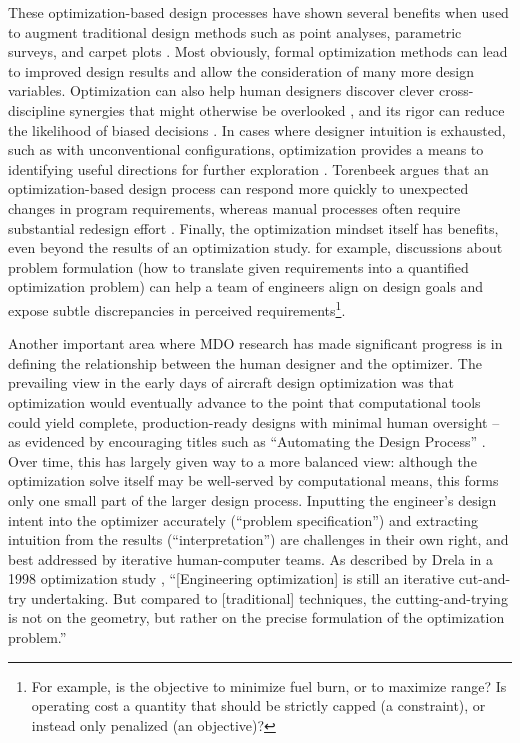 \documentclass[12pt,vi,oneside]{report}
\begin{document}
    These optimization-based design processes have shown several benefits when used to augment traditional design methods such as point analyses, parametric surveys, and carpet plots \cite{torenbeek_advanced_2013}. Most obviously, formal optimization methods can lead to improved design results and allow the consideration of many more design variables. Optimization can also help human designers discover clever cross-discipline synergies that might otherwise be overlooked \cite{drela_pros_1998}, and its rigor can reduce the likelihood of biased decisions \cite{torenbeek_advanced_2013}. In cases where designer intuition is exhausted, such as with unconventional configurations, optimization provides a means to identifying useful directions for further exploration \cite{drela_pros_1998}. Torenbeek argues that an optimization-based design process can respond more quickly to unexpected changes in program requirements, whereas manual processes often require substantial redesign effort \cite{torenbeek_advanced_2013}. Finally, the optimization mindset itself has benefits, even beyond the results of an optimization study. for example, discussions about problem formulation (how to translate given requirements into a quantified optimization problem) can help a team of engineers align on design goals and expose subtle discrepancies in perceived requirements\footnote{For example, is the objective to minimize fuel burn, or to maximize range? Is operating cost a quantity that should be strictly capped (a constraint), or instead only penalized (an objective)?}.

    Another important area where MDO research has made significant progress is in defining the relationship between the human designer and the optimizer. The prevailing view in the early days of aircraft design optimization was that optimization would eventually advance to the point that computational tools could yield complete, production-ready designs with minimal human oversight -- as evidenced by encouraging titles such as ``Automating the Design Process'' \cite{heldenfels_automating_1973, heldenfels_automation_1974, vanderplaats_automated_1976}. Over time, this has largely given way to a more balanced view: although the optimization solve itself may be well-served by computational means, this forms only one small part of the larger design process. Inputting the engineer's design intent into the optimizer accurately (``problem specification'') and extracting intuition from the results (``interpretation'') are challenges in their own right, and best addressed by iterative human-computer teams. As described by Drela in a 1998 optimization study \cite{drela_pros_1998}, ``[Engineering optimization] is still an iterative cut-and-try undertaking. But compared to [traditional] techniques, the cutting-and-trying is not on the geometry, but rather on the precise formulation of the optimization problem.''
\end{document}
